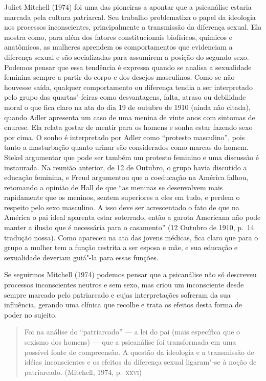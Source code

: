 Juliet Mitchell (1974) foi uma das pioneiras a apontar que a psicanálise
estaria marcada pela cultura patriarcal. Seu trabalho problematiza o
papel da ideologia nos processos inconscientes, principalmente a
transmissão da diferença sexual. Ela mostra como, para além dos fatores
constitucionais biofísicos, químicos e anatômicos, as mulheres aprendem
os comportamentos que evidenciam a diferença sexual e são socializadas
para assumirem a posição do segundo sexo. Podemos pensar que essa
tendência é expressa quando se analisa a sexualidade feminina sempre a
partir do corpo e dos desejos masculinos. Como se não houvesse saída,
qualquer comportamento ou diferença tendia a ser interpretado pelo grupo
das quartas"-feiras como desvantagens, falta, atraso ou debilidade moral
o que fica claro na ata do dia 19 de outubro de 1910 (ainda não citada),
quando Adler apresenta um caso de uma menina de vinte anos com sintomas
de enurese. Ela relata gostar de mentir para os homens e sonha estar
fazendo sexo por cima. O sonho é interpretado por Adler como ``protesto
masculino'', pois tanto a masturbação quanto urinar são considerados como
marcas do homem. Stekel argumentar que pode ser também um protesto
feminino e uma discussão é instaurada. Na reunião anterior, de 12 de
Outubro, o grupo havia discutido a educação feminina, e Freud argumentou
que a coeducação na América falhou, retomando a opinião de Hall de que
``as meninas se desenvolvem mais rapidamente que os meninos, sentem
 superiores a eles em tudo, e perdem o respeito pelo sexo masculino. A
 isso deve ser acrescentado o fato de que na América o pai ideal aparenta
 estar soterrado, então a garota Americana não pode manter a ilusão que é
 necessária para o casamento'' (12 Outubro de 1910, p.~14 tradução nossa).
Como apareceu na ata das jovens médicas, fica claro que para o grupo a
mulher tem a função restrita a ser esposa e mãe, e sua educação e
sexualidade deveriam guiá"-la para essas funções.

Se seguirmos Mitchell (1974) podemos pensar que a psicanálise não só
descreveu processos inconscientes neutros e sem sexo, mas criou um
inconsciente desde sempre marcado pelo patriarcado e cujas
interpretações sofreram da sua influência, gerando uma clínica que
recolhe e trata os efeitos desta forma de poder no sujeito.

\begin{quote}
Foi na análise do ``patriarcado'' --- a lei do pai (mais específica que o
sexismo dos homens) --- que a psicanálise foi transformada em uma
possível fonte de compreensão. A questão da ideologia e a transmissão de
idéias inconscientes e os efeitos da diferença sexual ligaram"-se à noção
de patriarcado. (Mitchell, 1974, p.~\textsc{xxvi})
\end{quote}

